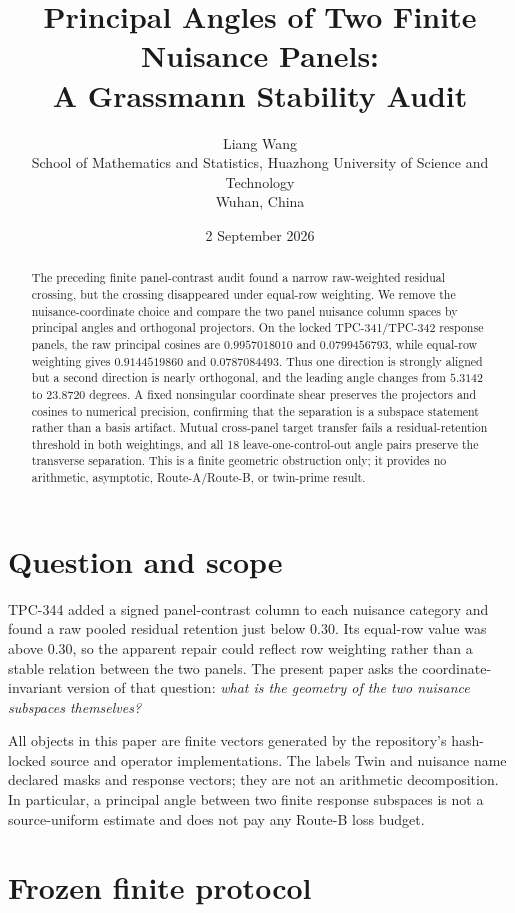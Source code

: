 \documentclass[11pt]{article}
\title{Principal Angles of Two Finite Nuisance Panels:\\
       A Grassmann Stability Audit}
\author{Liang Wang\\
School of Mathematics and Statistics, Huazhong University of Science and Technology\\
Wuhan, China}
\date{2 September 2026}
\begin{document}
\maketitle

\begin{abstract}
The preceding finite panel-contrast audit found a narrow raw-weighted
residual crossing, but the crossing disappeared under equal-row weighting.
We remove the nuisance-coordinate choice and compare the two panel nuisance
column spaces by principal angles and orthogonal projectors.  On the locked
TPC-341/TPC-342 response panels, the raw principal cosines are
$0.9957018010$ and $0.0799456793$, while equal-row weighting gives
$0.9144519860$ and $0.0787084493$.  Thus one direction is strongly aligned
but a second direction is nearly orthogonal, and the leading angle changes
from $5.3142$ to $23.8720$ degrees.  A fixed nonsingular coordinate shear
preserves the projectors and cosines to numerical precision, confirming that
the separation is a subspace statement rather than a basis artifact.  Mutual
cross-panel target transfer fails a residual-retention threshold in both
weightings, and all 18 leave-one-control-out angle pairs preserve the
transverse separation.  This is a finite geometric obstruction only; it
provides no arithmetic, asymptotic, Route-A/Route-B, or twin-prime result.
\end{abstract}

\section{Question and scope}

TPC-344 added a signed panel-contrast column to each nuisance category and
found a raw pooled residual retention just below $0.30$.  Its equal-row value
was above $0.30$, so the apparent repair could reflect row weighting rather
than a stable relation between the two panels.  The present paper asks the
coordinate-invariant version of that question:
\emph{what is the geometry of the two nuisance subspaces themselves?}

All objects in this paper are finite vectors generated by the repository's
hash-locked source and operator implementations.  The labels Twin and
nuisance name declared masks and response vectors; they are not an arithmetic
decomposition.  In particular, a principal angle between two finite
response subspaces is not a source-uniform estimate and does not pay any
Route-B loss budget.

\section{Frozen finite protocol}
\end{document}
